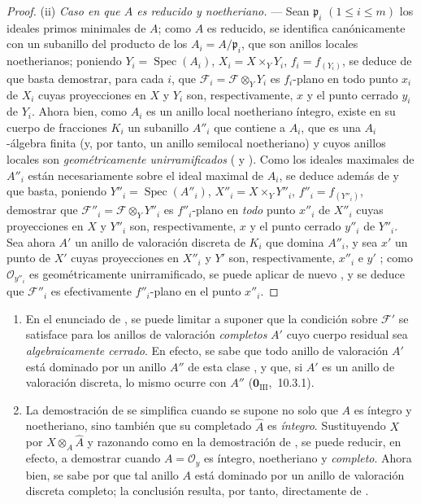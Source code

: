 \begin{proof}
(ii) \emph{Caso en que $A$ es reducido y noetheriano.} --- Sean $\mathfrak p_i$ $(1\leq i\leq m)$ los ideales primos minimales de $A$; como $A$ es reducido, se identifica canónicamente con un subanillo del producto de los $A_i=A/\mathfrak p_i$, que son anillos locales noetherianos; poniendo $Y_i=\operatorname{Spec}(A_i)$, $X_i=X\times_Y Y_i$, $f_i=f_{(Y_i)}$, se deduce de  que basta demostrar, para cada $i$, que $\mathcal F_i=\mathcal F\otimes_Y Y_i$ es $f_i$-plano en todo punto $x_i$ de $X_i$ cuyas proyecciones en $X$ y $Y_i$ son, respectivamente, $x$ y el punto cerrado $y_i$ de $Y_i$.
Ahora bien, como $A_i$ es un anillo local noetheriano íntegro, existe en su cuerpo de fracciones $K_i$ un subanillo $A''_i$ que contiene a $A_i$, que es una $A_i$-álgebra finita (y, por tanto, un anillo semilocal noetheriano) y cuyos anillos locales son \emph{geométricamente unirramificados} ( y ).
Como los ideales maximales de $A''_i$ están necesariamente sobre el ideal maximal de $A_i$, se deduce además de  y  que basta, poniendo $Y''_i=\operatorname{Spec}(A''_i)$, $X''_i=X\times_Y Y''_i$, $f''_i=f_{(Y''_i)}$, demostrar que $\mathcal F''_i=\mathcal F\otimes_Y Y''_i$ es $f''_i$-plano en \emph{todo} punto $x''_i$ de $X''_i$ cuyas proyecciones en $X$ y $Y''_i$ son, respectivamente, $x$ y el punto cerrado $y''_i$ de $Y''_i$.
Sea ahora $A'$ un anillo de valoración discreta de $K_i$ que domina $A''_i$, y sea $x'$ un punto de $X'$ cuyas proyecciones en $X''_i$ y $Y'$ son, respectivamente, $x''_i$ e $y'$ ; como $\mathcal O_{y''_i}$ es geométricamente unirramificado, se puede aplicar de nuevo , y se deduce que $\mathcal F''_i$ es efectivamente $f''_i$-plano en el punto $x''_i$.
\end{proof}

\begin{remarks}[11.8.2]
\label{IV.11.8.2}
\medskip\noindent
\begin{enumerate}[label=(\roman*)]
  \item En el enunciado de , se puede limitar a suponer que la condición sobre $\mathcal F'$ se satisface para los anillos de valoración \emph{completos} $A'$ cuyo cuerpo residual sea \emph{algebraicamente cerrado}.
  En efecto, se sabe que todo anillo de valoración $A'$ está dominado por un anillo $A''$ de esta clase , y que, si $A'$ es un anillo de valoración discreta, lo mismo ocurre con $A''$ ($\mathbf{0}_{\mathrm{III}}$,~10.3.1).
  \item La demostración de  se simplifica cuando se supone no solo que $A$ es íntegro y noetheriano, sino también que su completado $\widehat A$ es \emph{íntegro}.
  Sustituyendo $X$ por $X\otimes_A\widehat A$ y razonando como en la demostración de , se puede reducir, en efecto, a demostrar  cuando $A=\mathcal O_y$ es íntegro, noetheriano y \emph{completo}.
  Ahora bien, se sabe por  que tal anillo $A$ está dominado por un anillo de valoración discreta completo; la conclusión resulta, por tanto, directamente de .
\end{enumerate}
\end{remarks}

